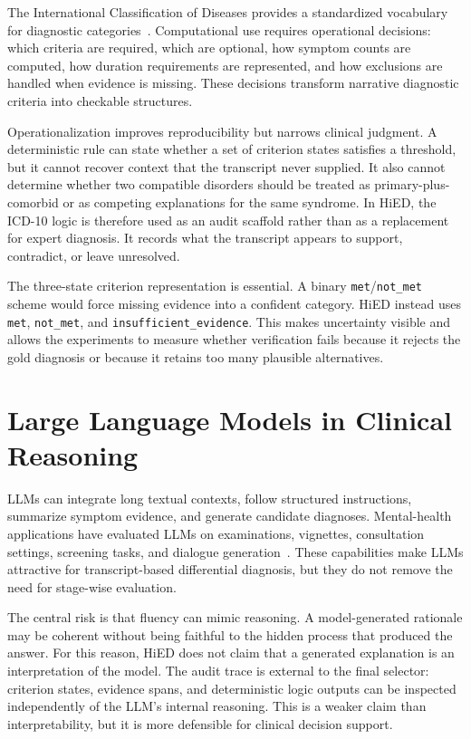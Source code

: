 The International Classification of Diseases provides a standardized vocabulary for diagnostic categories~\citep{who2019icd10}. Computational use requires operational decisions: which criteria are required, which are optional, how symptom counts are computed, how duration requirements are represented, and how exclusions are handled when evidence is missing. These decisions transform narrative diagnostic criteria into checkable structures.

Operationalization improves reproducibility but narrows clinical judgment. A deterministic rule can state whether a set of criterion states satisfies a threshold, but it cannot recover context that the transcript never supplied. It also cannot determine whether two compatible disorders should be treated as primary-plus-comorbid or as competing explanations for the same syndrome. In HiED, the ICD-10 logic is therefore used as an audit scaffold rather than as a replacement for expert diagnosis. It records what the transcript appears to support, contradict, or leave unresolved.

The three-state criterion representation is essential. A binary \texttt{met}/\texttt{not\_met} scheme would force missing evidence into a confident category. HiED instead uses \texttt{met}, \texttt{not\_met}, and \texttt{insufficient\_evidence}. This makes uncertainty visible and allows the experiments to measure whether verification fails because it rejects the gold diagnosis or because it retains too many plausible alternatives.

\section{Large Language Models in Clinical Reasoning}

LLMs can integrate long textual contexts, follow structured instructions, summarize symptom evidence, and generate candidate diagnoses. Mental-health applications have evaluated LLMs on examinations, vignettes, consultation settings, screening tasks, and dialogue generation~\citep{li2024taiwan,raballo2025,sarma2025}. These capabilities make LLMs attractive for transcript-based differential diagnosis, but they do not remove the need for stage-wise evaluation.

The central risk is that fluency can mimic reasoning. A model-generated rationale may be coherent without being faithful to the hidden process that produced the answer. For this reason, HiED does not claim that a generated explanation is an interpretation of the model. The audit trace is external to the final selector: criterion states, evidence spans, and deterministic logic outputs can be inspected independently of the LLM's internal reasoning. This is a weaker claim than interpretability, but it is more defensible for clinical decision support.

